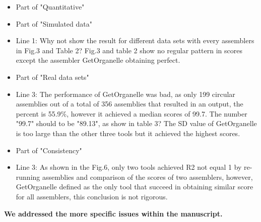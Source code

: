 \documentclass[a4paper,10pt]{scrartcl}
\begin{document}
\begin{itemize}
    \item Part of "Quantitative"  
    \item Part of "Simulated data"
    \item Line 1: Why not show the result for different data sets with every assemblers in Fig.3 and Table 2? Fig.3 and table 2 show no regular pattern in scores except the assembler GetOrganelle obtaining perfect.
    \item Part of "Real data sets"
    \item Line 3: The performance of GetOrganelle was bad, as only 199 circular assemblies out of a total of 356 assemblies that resulted in an output, the percent is 55.9\%, however it achieved a median scores of 99.7. The number "99.7" should to be "89.13", as show in table 3? The SD value of GetOrganelle is too large than the other three tools but it achieved the highest scores.
    \item Part of "Consistency"
    \item Line 3: As shown in the Fig.6, only two tools achieved R2  not equal 1 by re-running assemblies and comparison of the scores of two assemblers, however, GetOrganelle defined as the only tool that succeed in obtaining similar score for all assemblers, this conclusion is not rigorous.
\end{itemize}

\textbf{We addressed the more specific issues within the manuscript.}
\end{document}
